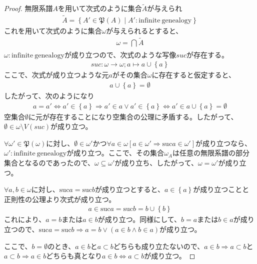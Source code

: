 \documentclass[dvipdfmx]{jsarticle}
\begin{document}
\begin{proof}
無限系譜$A$を用いて次式のように集合$\widetilde{A}$が与えられ
\begin{align*}
\widetilde{A} = \left\{ A'\in \mathfrak{P}(A) \middle| A':\mathrm{infinite\ genealogy} \right\}
\end{align*}
これを用いて次式のように集合$\omega$が与えられるとすると、
\begin{align*}
\omega = \bigcap_{} \widetilde{A}
\end{align*}
$\omega:\mathrm{infinite\ genealogy}$が成り立つので、次式のような写像$suc$が存在する。
\begin{align*}
suc:\omega \rightarrow \omega;a \mapsto a \cup \left\{ a \right\}
\end{align*}
ここで、次式が成り立つような元$a$がその集合$\omega$に存在すると仮定すると、
\begin{align*}
a \cup \left\{ a \right\} = \emptyset
\end{align*}
したがって、次のようになり
\begin{align*}
a = a' \Leftrightarrow a' \in \left\{ a \right\} \Rightarrow a' \in a \vee a' \in \left\{ a \right\} \Leftrightarrow a' \in a \cup \left\{ a \right\} = \emptyset
\end{align*}
空集合$\emptyset$に元が存在することになり空集合の公理に矛盾する。したがって、$\emptyset \in \omega \setminus V(suc)$が成り立つ。\par
$\forall\omega'\in \mathfrak{P}(\omega)$に対し、$\emptyset \in \omega'$かつ$\forall a \in \omega\left[ a \in \omega' \Rightarrow {\mathrm{suc} }a \in \omega' \right]$が成り立つなら、$\omega':\mathrm{infinite\ genealogy}$が成り立つ。ここで、その集合$\omega_{A}$は任意の無限系譜の部分集合となるのであったので、$\omega \subseteq \omega'$が成り立ち、したがって、$\omega = \omega'$が成り立つ。\par
$\forall a,b \in \omega$に対し、${\mathrm{suc} }a = {\mathrm{suc} }b$が成り立つとすると、$a \in \left\{ a \right\}$が成り立つことと正則性の公理より次式が成り立つ。
\begin{align*}
a \in {\mathrm{suc} }a = {\mathrm{suc} }b = b \cup \left\{ b \right\}
\end{align*}
これにより、$a = b$または$a \in b$が成り立つ。同様にして、$b = a$または$b \in a$が成り立つので、${\mathrm{suc} }a = {\mathrm{suc} }b \Rightarrow a = b \vee (a \in b \land b \in a)$が成り立つ。\par
ここで、$b = \emptyset$のとき、$a \in b$と$a \subset b$どちらも成り立たないので、$a \in b \Rightarrow a \subset b$と$a \subset b \Rightarrow a \in b$どちらも真となり$a \in b \Leftrightarrow a \subset b$が成り立つ。\par

\end{proof}
\end{document}
